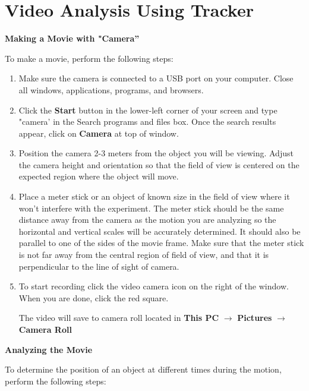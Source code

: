 
\section{Video Analysis Using Tracker}
\label{tracker}


\textbf{Making a Movie with "Camera''} 

To make a movie, perform the following steps:

\begin{enumerate}

\item Make sure the camera is connected to a USB port on your computer. 
Close all windows, applications, programs, and browsers.

\item Click the {\bf Start} button in the lower-left corner of your screen and 
type "camera' in the Search programs and files box. 
Once the search results appear, click on {\bf Camera} at top of window.



\item Position the camera 2-3 meters from the object you will be viewing. 
Adjust the camera height and orientation so that the field of view is 
centered on the expected region where the object will move. 

\item Place a meter stick or an object of known size in the field of view where 
it won't interfere with the experiment. 
The meter stick should be the same distance away from the camera as the motion 
you are analyzing so the horizontal and vertical scales will be accurately determined. 
It should also be parallel to one of the sides of the movie frame. 
Make sure that the meter stick is not far away from the central region of field of view, and that it is perpendicular to the line of sight of camera.


\item To start recording click the video camera icon on the right of the window. When you are done, click the red square. 

The video will save to camera roll located in {\bf This PC} $\rightarrow$ {\bf Pictures} $\rightarrow$ {\bf Camera Roll}

\end{enumerate}

\textbf{Analyzing the Movie} 

To determine the position of an object at different times during the
motion, perform the following steps:

